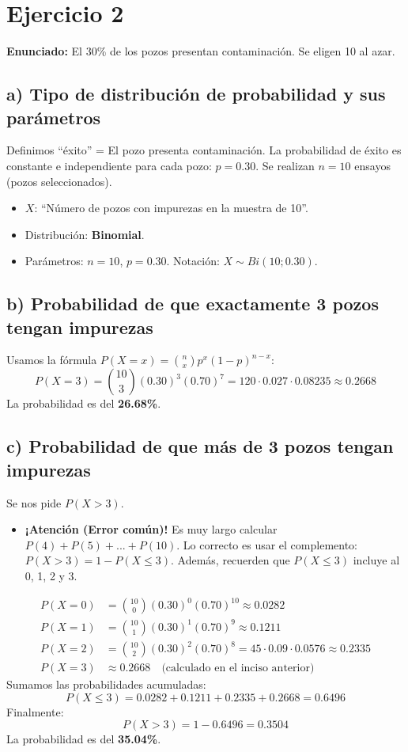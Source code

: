 \documentclass[11pt, a4paper]{article}
\begin{document}
\section*{Ejercicio 2}
\textbf{Enunciado:} El 30\% de los pozos presentan contaminación. Se eligen 10 al azar.

\subsection*{a) Tipo de distribución de probabilidad y sus parámetros}
Definimos ``éxito'' = El pozo presenta contaminación. 
La probabilidad de éxito es constante e independiente para cada pozo: $p = 0.30$.
Se realizan $n = 10$ ensayos (pozos seleccionados).
\begin{itemize}
    \item $X$: ``Número de pozos con impurezas en la muestra de 10''.
    \item Distribución: \textbf{Binomial}.
    \item Parámetros: $n = 10$, $p = 0.30$. Notación: $X \sim Bi(10; 0.30)$.
\end{itemize}

\subsection*{b) Probabilidad de que exactamente 3 pozos tengan impurezas}
Usamos la fórmula $P(X = x) = \binom{n}{x} p^x (1-p)^{n-x}$:
\begin{equation*}
P(X = 3) = \binom{10}{3} (0.30)^3 (0.70)^7 = 120 \cdot 0.027 \cdot 0.08235 \approx 0.2668
\end{equation*}
La probabilidad es del \textbf{26.68\%}.

\subsection*{c) Probabilidad de que más de 3 pozos tengan impurezas}
Se nos pide $P(X > 3)$.
\begin{itemize}
    \item \textbf{¡Atención (Error común)!} Es muy largo calcular $P(4)+P(5)+...+P(10)$. Lo correcto es usar el complemento: $P(X > 3) = 1 - P(X \le 3)$. Además, recuerden que $P(X \le 3)$ incluye al 0, 1, 2 y 3.
\end{itemize}
\begin{align*}
P(X = 0) &= \binom{10}{0} (0.30)^0 (0.70)^{10} \approx 0.0282 \\
P(X = 1) &= \binom{10}{1} (0.30)^1 (0.70)^9 \approx 0.1211 \\
P(X = 2) &= \binom{10}{2} (0.30)^2 (0.70)^8 = 45 \cdot 0.09 \cdot 0.0576 \approx 0.2335 \\
P(X = 3) &\approx 0.2668 \quad \text{(calculado en el inciso anterior)}
\end{align*}
Sumamos las probabilidades acumuladas:
\begin{equation*}
P(X \le 3) = 0.0282 + 0.1211 + 0.2335 + 0.2668 = 0.6496
\end{equation*}
Finalmente:
\begin{equation*}
P(X > 3) = 1 - 0.6496 = 0.3504
\end{equation*}
La probabilidad es del \textbf{35.04\%}.
\end{document}
